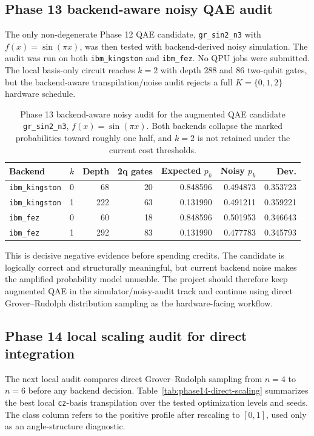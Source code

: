 \subsection{Phase 13 backend-aware noisy QAE audit}

The only non-degenerate Phase 12 QAE candidate,
\texttt{gr\_sin2\_n3} with \(f(x)=\sin(\pi x)\), was then tested with
backend-derived noisy simulation. The audit was run on both
\texttt{ibm\_kingston} and \texttt{ibm\_fez}. No QPU jobs were submitted. The
local basis-only circuit reaches \(k=2\) with depth 288 and 86 two-qubit gates,
but the backend-aware transpilation/noise audit rejects a full
\(K=\{0,1,2\}\) hardware schedule.

\begin{table}[h]
\centering
\small
\begin{tabular}{llrrrrr}
\toprule
Backend & \(k\) & Depth & 2q gates & Expected \(p_k\) & Noisy \(p_k\) & Dev. \\
\midrule
\texttt{ibm\_kingston} & 0 & 68 & 20 & 0.848596 & 0.494873 & 0.353723 \\
\texttt{ibm\_kingston} & 1 & 222 & 63 & 0.131990 & 0.491211 & 0.359221 \\
\texttt{ibm\_fez} & 0 & 60 & 18 & 0.848596 & 0.501953 & 0.346643 \\
\texttt{ibm\_fez} & 1 & 292 & 83 & 0.131990 & 0.477783 & 0.345793 \\
\bottomrule
\end{tabular}
\caption{Phase 13 backend-aware noisy audit for the augmented QAE candidate
\texttt{gr\_sin2\_n3}, \(f(x)=\sin(\pi x)\). Both backends collapse the marked
probabilities toward roughly one half, and \(k=2\) is not retained under the
current cost thresholds.}
\label{tab:phase13-qae-noisy-audit}
\end{table}

This is decisive negative evidence before spending credits. The candidate is
logically correct and structurally meaningful, but current backend noise makes
the amplified probability model unusable. The project should therefore keep
augmented QAE in the simulator/noisy-audit track and continue using direct
Grover--Rudolph distribution sampling as the hardware-facing workflow.

\subsection{Phase 14 local scaling audit for direct integration}

The next local audit compares direct Grover--Rudolph sampling from \(n=4\) to
\(n=6\) before any backend decision. Table~\ref{tab:phase14-direct-scaling}
summarizes the best local \texttt{cz}-basis transpilation over the tested
optimization levels and seeds. The class column refers to the positive profile
after rescaling to \([0,1]\), used only as an angle-structure diagnostic.

